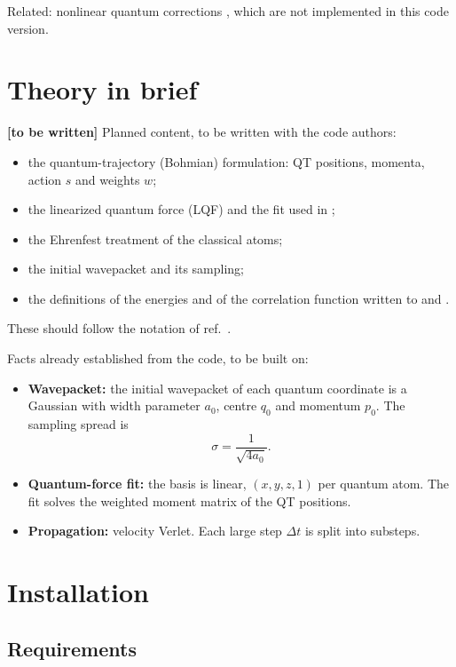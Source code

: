 \documentclass[11pt,a4paper]{report}
\newcommand{\code}[1]{\texttt{\detokenize{#1}}}
\newcommand{\todo}[1][to be written]{\textbf{\textcolor{red!70!black}{[#1]}}}
\begin{document}
Related: nonlinear quantum corrections \cite{wang2016}, which are not
implemented in this code version.

\chapter{Theory in brief}

\todo{} Planned content, to be written with the code authors:
\begin{itemize}
\item the quantum-trajectory (Bohmian) formulation: QT positions, momenta,
  action $s$ and weights $w$;
\item the linearized quantum force (LQF) and the fit used in \code{qpot};
\item the Ehrenfest treatment of the classical atoms;
\item the initial wavepacket and its sampling;
\item the definitions of the energies and of the correlation function
  written to \code{ener} and \code{cor}.
\end{itemize}
These should follow the notation of ref.~\cite{garashchuk2013}.

Facts already established from the code, to be built on:
\begin{itemize}
\item \textbf{Wavepacket:} the initial wavepacket of each quantum coordinate
  is a Gaussian with width parameter $a_0$, centre $q_0$ and momentum $p_0$.
  The sampling spread is
  \begin{equation}
    \sigma = \frac{1}{\sqrt{4 a_0}} .
  \end{equation}
\item \textbf{Quantum-force fit:} the basis is linear, $(x, y, z, 1)$ per
  quantum atom. The fit solves the weighted moment matrix of the QT
  positions.
\item \textbf{Propagation:} velocity Verlet. Each large step $\Delta t$ is
  split into \code{kout} substeps.
\end{itemize}

\chapter{Installation}

\section{Requirements}
\end{document}
